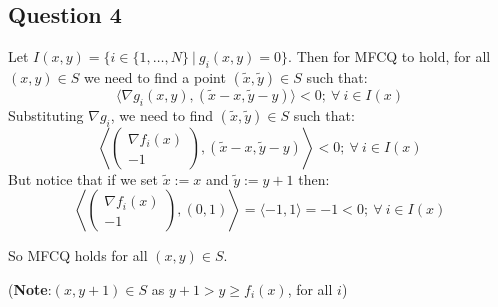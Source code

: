 \documentclass[12p]{article}
\begin{document}
\subsection*{Question 4}\hfil\par
Let \(I(x,y)=\{i\in\{1,\dots ,N\}\ |\ g_i(x,y)=0\}\). Then for MFCQ to hold, for all \((x,y)\in S\) we need to find a point \((\tilde x, \tilde y)\in S\) such that:
\[
  \langle \nabla g_i(x,  y), (\tilde x- x, \tilde y-y)\rangle<0;\ \forall\ i\in I(x)
\]
Substituting \(\nabla g_i\), we need to find \((\tilde x, \tilde y)\in S\) such that:
\[
    \left\langle \begin{pmatrix}
        \nabla f_i(x)\\
         -1
        \end{pmatrix}    , (\tilde x- x, \tilde y-y)\right\rangle<0;\ \forall\ i\in I(x)
\]
But notice that if we set \(\tilde x:=x\) and \(\tilde y:=y+1\) then:
\[
    \left\langle \begin{pmatrix}
        \nabla f_i(x)\\
         -1
        \end{pmatrix}    , (0, 1)\right\rangle=\langle-1,1\rangle=-1<0;\ \forall\ i\in I(x)
\]

So MFCQ holds for all \((x,y)\in S\).

(\textbf{Note}:\((x,y+1)\in S\) as \(y+1>y\geq f_i(x)\), for all \(i\))
\end{document}
